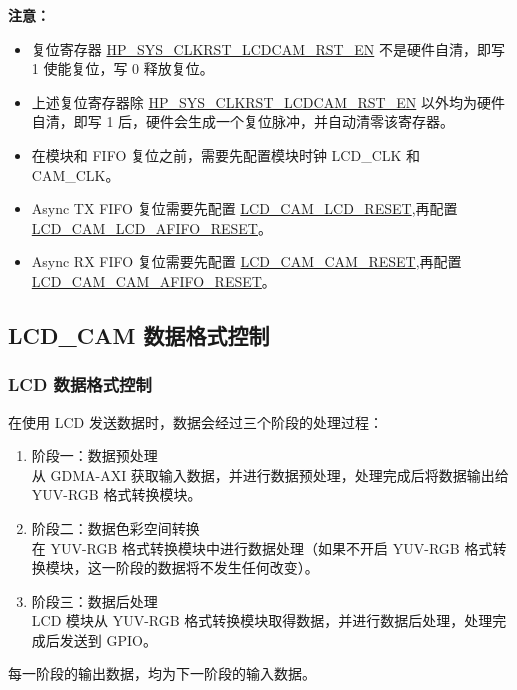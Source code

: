 \documentclass[main\_\_CN.tex]{subfiles}
\begin{document}
{\bfseries 注意：}
\begin{itemize}
    \item 复位寄存器 \hyperref[fielddesc:HPSYSCLKRSTLCDCAMRSTEN]{HP\_SYS\_CLKRST\_LCDCAM\_RST\_EN} 不是硬件自清，即写 1 使能复位，写 0 释放复位。
    \item 上述复位寄存器除 \hyperref[fielddesc:HPSYSCLKRSTLCDCAMRSTEN]{HP\_SYS\_CLKRST\_LCDCAM\_RST\_EN} 以外均为硬件自清，即写 1 后，硬件会生成一个复位脉冲，并自动清零该寄存器。
    \item 在模块和 FIFO 复位之前，需要先配置模块时钟 LCD\_CLK 和 CAM\_CLK。
    \item Async TX FIFO 复位需要先配置 \hyperref[fielddesc:LCDCAMLCDRESET]{LCD\_CAM\_LCD\_RESET},再配置 \hyperref[fielddesc:LCDCAMLCDAFIFORESET]{LCD\_CAM\_LCD\_AFIFO\_RESET}。
    \item Async RX FIFO 复位需要先配置 \hyperref[fielddesc:LCDCAMCAMRESET]{LCD\_CAM\_CAM\_RESET},再配置 \hyperref[fielddesc:LCDCAMCAMAFIFORESET]{LCD\_CAM\_CAM\_AFIFO\_RESET}。    
\end{itemize}

\subsection{LCD\_CAM 数据格式控制}
\subsubsection{LCD 数据格式控制} \label{lcd_data_control}
在使用 LCD 发送数据时，数据会经过三个阶段的处理过程：
\begin{enumerate}
    \item 阶段一：数据预处理\\
    从 GDMA-AXI 获取输入数据，并进行数据预处理，处理完成后将数据输出给 YUV-RGB 格式转换模块。
    \item 阶段二：数据色彩空间转换\\
    在 YUV-RGB 格式转换模块中进行数据处理（如果不开启 YUV-RGB 格式转换模块，这一阶段的数据将不发生任何改变）。
    \item 阶段三：数据后处理\\
    LCD 模块从 YUV-RGB 格式转换模块取得数据，并进行数据后处理，处理完成后发送到 GPIO。

\end{enumerate}


\begin{tiplisting}
每一阶段的输出数据，均为下一阶段的输入数据。
\end{tiplisting}
\end{document}
